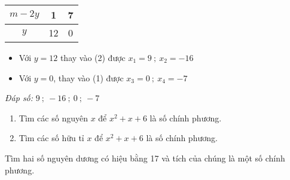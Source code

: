 \begin{bt}
{\begin{enumerate}
\begin{center}
\begin{tabular}{|c|c|c|}
                \hline
                $m-2y$ & 1 & 7 \\
                \hline 
                $y$ & 12 & 0 \\
                \hline
\end{tabular}
\end{center}
    \begin{itemize}
        \item Với $y=12$ thay vào (2) được $x_1=9\ ;\ x_2=-16$
        \item Với $y=0$, thay vào (1) được $x_3=0\ ;\ x_4=-7$
    \end{itemize}
    \emph{Đáp số:} $9\ ;\ -16\ ;\ 0\ ;\ -7$
\end{enumerate}
}
\end{bt}

\begin{bt}
    \begin{enumerate}
        \item Tìm các số nguyên $x$ để $x^2+x+6$ là số chính phương.
        \item Tìm các số hữu tỉ $x$ để $x^2+x+6$ là số chính phương.
\end{enumerate}
\end{bt}

\begin{bt}
    Tìm hai số nguyên dương có hiệu bằng 17 và tích của chúng là một số chính phương.
\end{bt}

